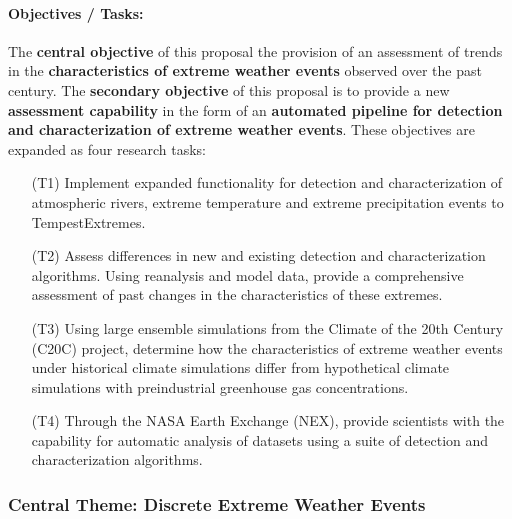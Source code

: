 \documentclass[11pt]{article}
\begin{document}
\paragraph{Objectives / Tasks:}  The \textbf{central objective} of this proposal the provision of an assessment of trends in the \textbf{characteristics of extreme weather events} observed over the past century.  The \textbf{secondary objective} of this proposal is to provide a new \textbf{assessment capability} in the form of an \textbf{automated pipeline for detection and characterization of extreme weather events}.  These objectives are expanded as four research tasks: 
\begin{itemize}
\item[(T1)] Implement expanded functionality for detection and characterization of atmospheric rivers, extreme temperature and extreme precipitation events to TempestExtremes.

\item[(T2)] Assess differences in new and existing detection and characterization algorithms.  Using reanalysis and model data, provide a comprehensive assessment of past changes in the characteristics of these extremes.

\item[(T3)] Using large ensemble simulations from the Climate of the 20th Century (C20C) project, determine how the characteristics of extreme weather events under historical climate simulations differ from hypothetical climate simulations with preindustrial greenhouse gas concentrations.


\item[(T4)] Through the NASA Earth Exchange (NEX), provide scientists with the capability for automatic analysis of datasets using a suite of detection and characterization algorithms. 
\end{itemize}


\subsubsection{Central Theme: Discrete Extreme Weather Events}
\end{document}
